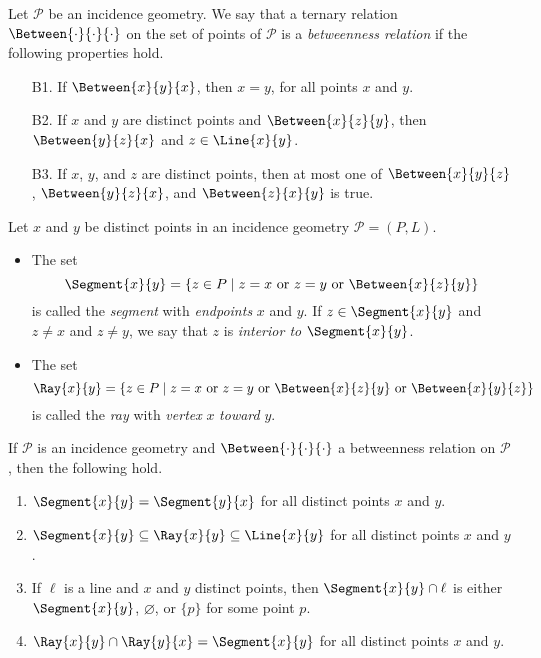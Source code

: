 \documentclass{article}
\begin{document}

\begin{dfn}[Betweenness]
Let $\mathcal{P}$ be an incidence geometry. We say that a ternary relation $\Between{\cdot}{\cdot}{\cdot}$ on the set of points of $\mathcal{P}$ is a \emph{betweenness relation} if the following properties hold.
\begin{itemize}
\item[B1.] If $\Between{x}{y}{x}$, then $x = y$, for all points $x$ and $y$.
\item[B2.] If $x$ and $y$ are distinct points and $\Between{x}{z}{y}$, then $\Between{y}{z}{x}$ and $z \in \Line{x}{y}$.
\item[B3.] If $x$, $y$, and $z$ are distinct points, then at most one of $\Between{x}{y}{z}$, $\Between{y}{z}{x}$, and $\Between{z}{x}{y}$ is true. 
\end{itemize}
\end{dfn}

\begin{dfn}
Let $x$ and $y$ be distinct points in an incidence geometry $\mathcal{P} = (P,L)$.
\begin{itemize}
\item The set \[ \Segment{x}{y} = \{ z \in P \mid z = x\ \mathrm{or}\ z = y\ \mathrm{or}\ \Between{x}{z}{y} \} \] is called the \emph{segment} with \emph{endpoints} $x$ and $y$. If $z \in \Segment{x}{y}$ and $z \neq x$ and $z \neq y$, we say that $z$ is \emph{interior to} $\Segment{x}{y}$.
\item The set \[ \Ray{x}{y} = \{ z \in P \mid z = x\ \mathrm{or}\ z = y\ \mathrm{or}\ \Between{x}{z}{y}\ \mathrm{or}\ \Between{x}{y}{z} \} \] is called the \emph{ray} with \emph{vertex} $x$ \emph{toward} $y$.
\end{itemize}
\end{dfn}

\begin{prop}
If $\mathcal{P}$ is an incidence geometry and $\Between{\cdot}{\cdot}{\cdot}$ a betweenness relation on $\mathcal{P}$, then the following hold.
\begin{enumerate}
\item $\Segment{x}{y} = \Segment{y}{x}$ for all distinct points $x$ and $y$.
\item $\Segment{x}{y} \subseteq \Ray{x}{y} \subseteq \Line{x}{y}$ for all distinct points $x$ and $y$.
\item If $\ell$ is a line and $x$ and $y$ distinct points, then $\Segment{x}{y} \cap \ell$ is either $\Segment{x}{y}$, $\varnothing$, or $\{p\}$ for some point $p$.
\item $\Ray{x}{y} \cap \Ray{y}{x} = \Segment{x}{y}$ for all distinct points $x$ and $y$.
\end{enumerate}
\end{prop}
\end{document}
